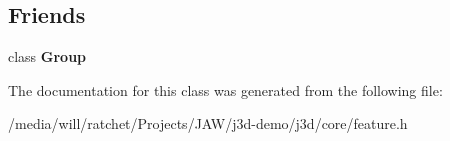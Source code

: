 \subsection*{Friends}
\begin{DoxyCompactItemize}
\item 
\hypertarget{classj3d_1_1core_1_1Feature_a2697825715974a353728f0d4d5658112}{}class {\bfseries Group}\label{classj3d_1_1core_1_1Feature_a2697825715974a353728f0d4d5658112}

\end{DoxyCompactItemize}


The documentation for this class was generated from the following file\+:\begin{DoxyCompactItemize}
\item 
/media/will/ratchet/\+Projects/\+J\+A\+W/j3d-\/demo/j3d/core/feature.\+h\end{DoxyCompactItemize}

